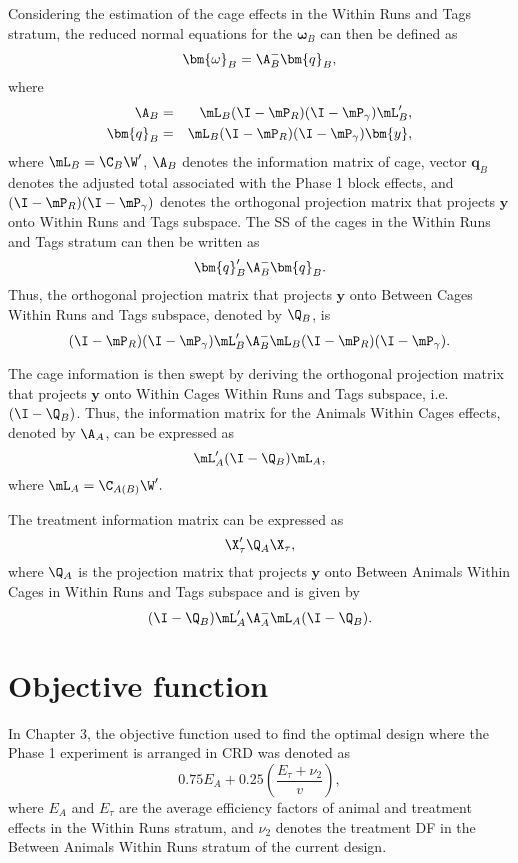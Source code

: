 Considering the estimation of the cage effects in the Within Runs and Tags stratum, the reduced normal equations for the $\bm{\omega}_B$ can then be defined as
\[ \bm{\omega}_B = \A_{B}^{-}\bm{q}_{B},\]
where
\begin{eqnarray*}
\A_{B} &=& \mL_{B} (\I-\mP_{R})( \I - \mP_{\gamma}) \mL_{B}' ,\\
\bm{q}_{B} &=& \mL_{B} (\I-\mP_{R})( \I - \mP_{\gamma})\bm{y},
\end{eqnarray*}
where $\mL_{B} = \C_B \W'$,  $\A_{B}$ denotes the information matrix of cage, vector $\bm{q}_{B}$ denotes the adjusted total associated with the Phase 1 block effects, and $(\I-\mP_{R})( \I - \mP_{\gamma})$ denotes the orthogonal projection matrix that projects $\bm{y}$ onto Within Runs and Tags subspace. The SS of the cages in the Within Runs and Tags stratum can then be written as 
\[
 \bm{q}_{B}' \A_{B}^{-} \bm{q}_{B}. 
\]
Thus, the orthogonal projection matrix that projects $\bm{y}$ onto Between Cages Within Runs and Tags  subspace, denoted by $\Q_{B}$, is 
\[ (\I-\mP_{R})( \I - \mP_{\gamma})\mL_{B}'\A_{B}^{-} \mL_{B} (\I-\mP_{R})( \I - \mP_{\gamma}). 
\] 

The cage information is then swept by deriving the orthogonal projection matrix that projects $\bm{y}$ onto Within Cages Within Runs and Tags subspace, i.e.\ $(\I - \Q_{B})$. Thus, the information matrix for the Animals Within Cages effects, denoted by $\A_{A}$, can be expressed as
\begin{equation}\label{eq:aniInfoMatChap4}
\mL_{A}' (\I - \Q_{B}) \mL_{A}, 
\end{equation}
where $\mL_{A} = \C_{A(B)} \W'.$

The treatment information matrix can be expressed as 
\begin{equation}\label{eq:trtInfoMatChap4}
\X_\tau' \Q_{A} \X_\tau,
\end{equation} 
where $\Q_A$ is the projection matrix that projects $\bm{y}$ onto Between Animals Within Cages in Within Runs and Tags subspace and is given by 
\[ 
(\I - \Q_{B})\mL_{A}' \A_{A}^{-} \mL_{A}(\I - \Q_{B}). 
\] 

\section{Objective function}
\label{sec:objFunChap4}
In Chapter 3, the objective function used to find the optimal design where the Phase 1 experiment is arranged in CRD was denoted as
\begin{equation}\label{eq:finalObjFun2}
0.75 E_A + 0.25 \left(\frac{ E_\tau +\nu_2}{v}\right),
\end{equation}
where $E_A$ and $E_\tau$ are the average efficiency factors of animal and treatment effects in the Within Runs stratum, and $\nu_2$ denotes the treatment DF in the Between Animals Within Runs stratum of the current design. 

